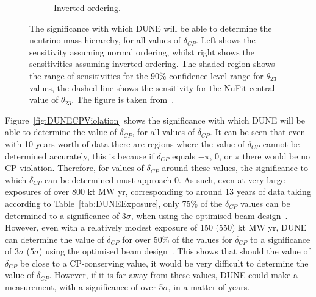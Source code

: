 \begin{figure}
\begin{subfigure}{0.49\textwidth}
    \caption{Inverted ordering.}
  \end{subfigure}
  \caption[The significance with which DUNE will be able to determine the neutrino mass hierarchy, for all values of $\delta_{CP}$]
          {The significance with which DUNE will be able to determine the neutrino mass hierarchy, for all values of $\delta_{CP}$. Left shows the sensitivity assuming normal ordering, whilst right shows the sensitivities assuming inverted ordering. The shaded region shows the range of sensitivities for the 90\% confidence level range for $\theta_{23}$ values, the dashed line shows the sensitivity for the NuFit central value of $\theta_{23}$. The figure is taken from~\citep{DUNE2335}.}
  \label{fig:DUNEMassHierarchy}
\end{figure}

Figure~\ref{fig:DUNECPViolation} shows the significance with which DUNE will be able to determine the value of $\delta_{CP}$, for all values of $\delta_{CP}$. It can be seen that even with 10 years worth of data there are regions where the value of $\delta_{CP}$ cannot be determined accurately, this is because if $\delta_{CP}$ equals $-\pi$, 0, or $\pi$ there would be no CP-violation. Therefore, for values of $\delta_{CP}$ around these values, the significance to which $\delta_{CP}$ can be determined must approach 0. As such, even at very large exposures of over 800 kt MW yr, corresponding to around 13 years of data taking according to Table~\ref{tab:DUNEExposure}, only 75\% of the $\delta_{CP}$ values can be determined to a significance of 3$\sigma$, when using the optimised beam design~\citep{DUNE2401}. However, even with a relatively modest exposure of 150 (550) kt MW yr, DUNE can determine the value of $\delta_{CP}$ for over 50\% of the values for $\delta_{CP}$ to a significance of 3$\sigma$ (5$\sigma$) using the optimised beam design~\citep{DUNE2401}. This shows that should the value of $\delta_{CP}$ be close to a CP-conserving value, it would be very difficult to determine the value of $\delta_{CP}$. However, if it is far away from these values, DUNE could make a measurement, with a significance of over 5$\sigma$, in a matter of years. \\


